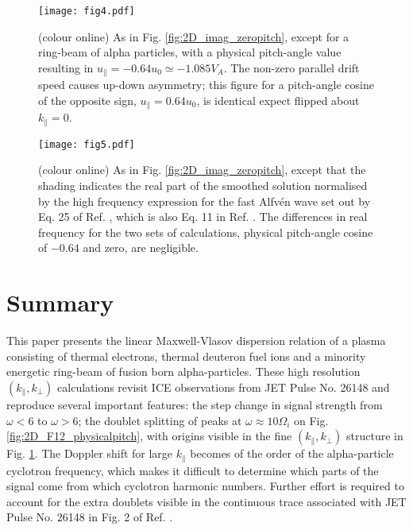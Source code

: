 \documentclass[12pt]{iopart}
\begin{document}
\begin{figure}[ht!]
    \raggedleft
\texttt{[image: fig4.pdf]}
    \caption{(colour online) As in Fig. \ref{fig:2D_imag_zeropitch}, except for a ring-beam of alpha particles, with a physical pitch-angle value resulting in $u_{\parallel} = -0.64 u_0 \simeq -1.085 V_A$. The non-zero parallel drift speed causes up-down asymmetry; this figure for a pitch-angle cosine of the opposite sign, $u_{\parallel} = 0.64 u_0$, is identical expect flipped about $k_\parallel=0$.}
    \label{fig:2D_imag_physicalpitch}
\end{figure}


\begin{figure}[ht!]
    \raggedleft
\texttt{[image: fig5.pdf]}
    \caption{(colour online) As in Fig. \ref{fig:2D_imag_zeropitch}, except that the shading indicates the real part of the smoothed solution normalised by the high frequency expression for the fast Alfv{\'e}n wave set out by Eq. 25 of Ref. \cite{Dendy1994}, which is also Eq. 11 in Ref. \cite{McClements1996}. The differences in real frequency for the two sets of calculations, physical pitch-angle cosine of $-0.64$ and zero, are negligible.}
    \label{fig:2D_real_zeropitch}
\end{figure}

\section{Summary}

This paper presents the linear Maxwell-Vlasov dispersion relation of a plasma consisting of thermal electrons, thermal deuteron fuel ions and a minority energetic ring-beam of fusion born alpha-particles. These high resolution $(k_\parallel, k_\perp)$ calculations revisit ICE observations from JET Pulse No. 26148\cite{Cottrell1993,Dendy1995} and reproduce several important features: the step change in signal strength from $\omega < 6$ to $\omega > 6$; the doublet splitting of peaks at $\omega \approx 10\Omega_i$ on Fig. \ref{fig:2D_F12_physicalpitch}, with origins visible in the fine $(k_\parallel, k_\perp)$ structure in Fig. \ref{fig:2D_imag_physicalpitch}. The Doppler shift for large $k_\parallel$ becomes of the order of the alpha-particle cyclotron frequency, which makes it difficult to determine which parts of the signal come from which cyclotron harmonic numbers. Further effort is required to account for the extra doublets visible in the continuous trace associated with JET Pulse No. 26148 in Fig. 2 of Ref. \cite{Cottrell1993}.
\end{document}
